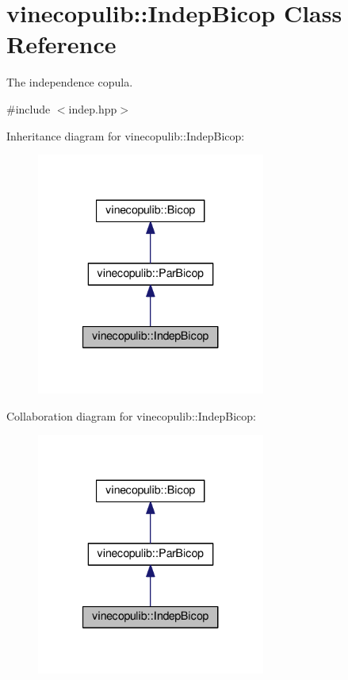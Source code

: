\hypertarget{classvinecopulib_1_1_indep_bicop}{}\section{vinecopulib\+:\+:Indep\+Bicop Class Reference}
\label{classvinecopulib_1_1_indep_bicop}


The independence copula.  




{\ttfamily \#include $<$indep.\+hpp$>$}



Inheritance diagram for vinecopulib\+:\+:Indep\+Bicop\+:\nopagebreak
\begin{figure}[H]
\begin{center}
\leavevmode
\includegraphics[width=213pt]{classvinecopulib_1_1_indep_bicop__inherit__graph}
\end{center}
\end{figure}


Collaboration diagram for vinecopulib\+:\+:Indep\+Bicop\+:\nopagebreak
\begin{figure}[H]
\begin{center}
\leavevmode
\includegraphics[width=213pt]{classvinecopulib_1_1_indep_bicop__coll__graph}
\end{center}
\end{figure}
